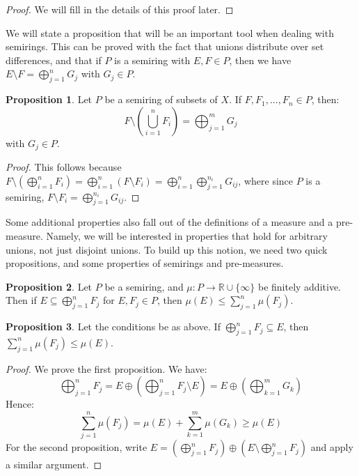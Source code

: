 \documentclass[11pt, oneside]{amsart}   	%
\theoremstyle{definition}
\newtheorem{prop}{Proposition}[section]
\begin{document}
	\begin{proof}
		We will fill in the details of this proof later.
	\end{proof}
	
	We will state a proposition that will be an important tool when dealing with semirings. This can be proved with the fact 
	that unions distribute over set differences, and that if $P$ is a semiring with $E, F\in P$, then we have 
	$E\setminus F = \bigoplus_{j = 1}^n G_j$ with $G_j\in P$.
	
	\begin{prop}
		Let $P$ be a semiring of subsets of $X$. If $F, F_1, ..., F_n\in P$, then:
		$$
			F\setminus (\bigcup_{i = 1}^n F_i) = \bigoplus_{j = 1}^m G_j
		$$
		with $G_j\in P$. 
	\end{prop}
	
	\begin{proof}
		This follows because $F\setminus (\bigoplus_{i = 1}^n F_i) = \bigoplus_{i = 1}^n (F\setminus F_i) = 
		\bigoplus_{i = 1}^n\bigoplus_{j = 1}^{n_i} G_{ij}$, where since $P$ is a semiring, $F\setminus F_i = 
		\bigoplus_{j = 1}^{n_i} G_{ij}$.
	\end{proof}
	
	Some additional properties also fall out of the definitions of a measure and a pre-measure. Namely, we will be interested 
	in properties that hold for arbitrary unions, not just disjoint unions. To build up this notion, we need two quick propositions, 
	and some properties of semirings and pre-measures. 
	
	\begin{prop}
		Let $P$ be a semiring, and $\mu : P\rightarrow\mathbb R\cup\{\infty\}$ be finitely additive. Then if $E\subseteq
		\bigoplus_{j = 1}^n F_j$ for $E, F_j\in P$, then $\mu(E)\leq\sum_{j = 1}^n\mu(F_j)$.
	\end{prop}
	
	\begin{prop}
		Let the conditions be as above. If $\bigoplus_{j = 1}^n F_j\subseteq E$, then $\sum_{j = 1}^n\mu(F_j)\leq \mu(E)$.
	\end{prop}
	
	\begin{proof}
		We prove the first proposition. We have:
		$$
			\bigoplus_{j = 1}^n F_j = E\oplus(\bigoplus_{j = 1}^n F_j\setminus E) = E\oplus (\bigoplus_{k = 1}^m G_k)
		$$
		Hence:
		$$
			\sum_{j = 1}^n\mu(F_j) = \mu(E) + \sum_{k = 1}^m\mu(G_k)\geq\mu(E)
		$$
		For the second proposition, write $E = (\bigoplus_{j = 1}^n F_j)\oplus(E\setminus\bigoplus_{j = 1}^n F_j)$ and apply 
		a similar argument.
	\end{proof}
	
\end{document}
